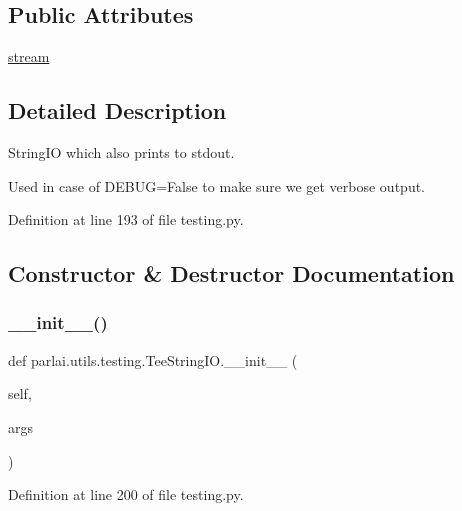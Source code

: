 \subsection*{Public Attributes}
\begin{DoxyCompactItemize}
\item 
\hyperlink{classparlai_1_1utils_1_1testing_1_1TeeStringIO_a4dc6e50f503b4679fe3b3fa0ebd729f1}{stream}
\end{DoxyCompactItemize}


\subsection{Detailed Description}
\begin{DoxyVerb}StringIO which also prints to stdout.

Used in case of DEBUG=False to make sure we get verbose output.
\end{DoxyVerb}
 

Definition at line 193 of file testing.\+py.



\subsection{Constructor \& Destructor Documentation}
\mbox{\label{classparlai_1_1utils_1_1testing_1_1TeeStringIO_a594bf609cf952ab21c412a4c520235d4}} 
\subsubsection{\texorpdfstring{\+\_\+\+\_\+init\+\_\+\+\_\+()}{\_\_init\_\_()}}
{\footnotesize\ttfamily def parlai.\+utils.\+testing.\+Tee\+String\+I\+O.\+\_\+\+\_\+init\+\_\+\+\_\+ (\begin{DoxyParamCaption}\item[{}]{self,  }\item[{}]{args }\end{DoxyParamCaption})}



Definition at line 200 of file testing.\+py.


